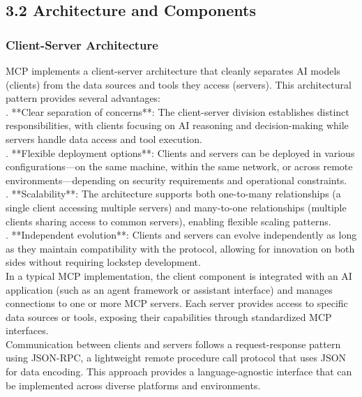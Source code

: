 \subsection{3.2 Architecture and Components}
\subsubsection{Client-Server Architecture}
MCP implements a client-server architecture that cleanly separates AI models (clients) from the data sources and tools they access (servers). This architectural pattern provides several advantages:\\ . **Clear separation of concerns**: The client-server division establishes distinct responsibilities, with clients focusing on AI reasoning and decision-making while servers handle data access and tool execution.\\ . **Flexible deployment options**: Clients and servers can be deployed in various configurations—on the same machine, within the same network, or across remote environments—depending on security requirements and operational constraints.\\ . **Scalability**: The architecture supports both one-to-many relationships (a single client accessing multiple servers) and many-to-one relationships (multiple clients sharing access to common servers), enabling flexible scaling patterns.\\ . **Independent evolution**: Clients and servers can evolve independently as long as they maintain compatibility with the protocol, allowing for innovation on both sides without requiring lockstep development.\\ \newline
In a typical MCP implementation, the client component is integrated with an AI application (such as an agent framework or assistant interface) and manages connections to one or more MCP servers. Each server provides access to specific data sources or tools, exposing their capabilities through standardized MCP interfaces.\\ \newline
Communication between clients and servers follows a request-response pattern using JSON-RPC, a lightweight remote procedure call protocol that uses JSON for data encoding. This approach provides a language-agnostic interface that can be implemented across diverse platforms and environments.\\
